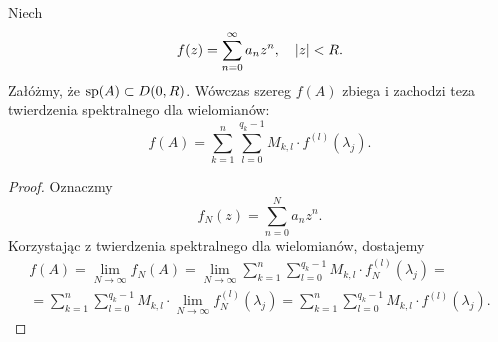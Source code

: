 %
\begin{theorem}
  Niech
  \begin{equation*}
    f(z) = \sum_{n=0}^{\infty} a_n z^n, \quad \lvert z\rvert < R.
  \end{equation*}
  Załóżmy, że $\operatorname{sp}(A) \subset D(0,R)$. Wówczas szereg $f(A)$ zbiega i zachodzi teza twierdzenia spektralnego dla 
  wielomianów:
  \begin{equation*}
    f(A) = \sum_{k=1}^{n} \sum_{l=0}^{q_k-1} M_{k,l} \cdot f^{(l)}(\lambda_j).
  \end{equation*}
\end{theorem}
%
\begin{proof}
  Oznaczmy
  \begin{equation*}
    f_N(z) = \sum_{n=0}^N a_n z^n.
  \end{equation*}
  Korzystając z twierdzenia spektralnego dla wielomianów, dostajemy
  \begin{multline*}
    f(A) = \lim_{N\to\infty} f_N(A) 
    = \lim_{N\to\infty} \sum_{k=1}^{n} \sum_{l=0}^{q_k-1} M_{k,l} \cdot f_N^{(l)}(\lambda_j) = \\
    = \sum_{k=1}^{n} \sum_{l=0}^{q_k-1} M_{k,l} \cdot \lim_{N\to\infty} f_N^{(l)}(\lambda_j)
    = \sum_{k=1}^{n} \sum_{l=0}^{q_k-1} M_{k,l} \cdot f^{(l)}(\lambda_j). \tag*{\qedhere}
  \end{multline*}
\end{proof}
































